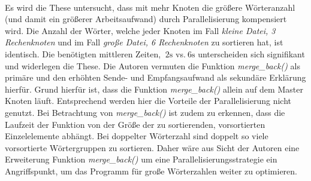 \\
Es wird die These untersucht, dass mit mehr Knoten die größere Wörteranzahl (und damit ein größerer Arbeitsaufwand) durch Parallelisierung kompensiert wird. Die Anzahl der Wörter, welche jeder Knoten im Fall \textit{kleine Datei, 3 Rechenknoten} und im Fall \textit{große Datei, 6 Rechenknoten} zu sortieren hat, ist identisch. Die benötigten mittleren Zeiten, $~2\text{s}$ vs.$~6\text{s}$ unterscheiden sich signifikant und widerlegen die These. Die Autoren vermuten die Funktion \textit{merge\_back()} als primäre und den erhöhten Sende- und Empfangsaufwand als sekundäre Erklärung hierfür. Grund hierfür ist, dass die Funktion \textit{merge\_back()} allein auf dem Master Knoten läuft. Entsprechend werden hier die Vorteile der Parallelisierung nicht genutzt. Bei Betrachtung von \textit{merge\_back()} ist zudem zu erkennen, dass die Laufzeit der Funktion von der Größe der zu sortierenden, vorsortierten Einzelelemente abhängt. Bei doppelter Wörterzahl sind doppelt so viele vorsortierte Wörtergruppen zu sortieren. Daher wäre aus Sicht der Autoren eine Erweiterung Funktion \textit{merge\_back()} um eine Parallelisierungsstrategie ein Angriffspunkt, um das Programm für große Wörterzahlen weiter zu optimieren.